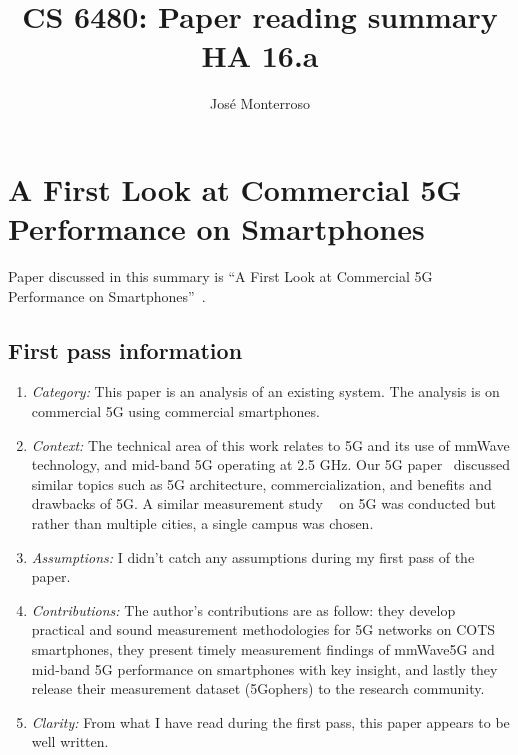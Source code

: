 \documentclass[letterpaper,twocolumn,10pt]{article}
\title{CS 6480: Paper reading summary\\
HA 16.a\\}
\author{José Monterroso}
\affil{School of Computing, University of Utah}
\begin{document}
\maketitle
\section{A First Look at Commercial 5G Performance on Smartphones}

Paper discussed in this summary is ``A First Look at Commercial 5G Performance on Smartphones''~\cite{commercial5g}.

\subsection{First pass information}
\label{sec:first}
\begin{enumerate}

\item {\it Category:} 
This paper is an analysis of an existing system. The analysis is on commercial 5G using commercial smartphones.

\item {\it Context:} 
The technical area of this work relates to 5G and its use of mmWave technology, and mid-band 5G operating at 
2.5 GHz. Our 5G paper~\cite{5gwhite} discussed similar topics such as 5G architecture, commercialization, and 
benefits and drawbacks of 5G. A similar measurement study ~\cite{measurementstudy} on 5G was conducted but 
rather than multiple cities, a single campus was chosen.

\item {\it Assumptions:}  
I didn't catch any assumptions during my first pass of the paper. 

\item {\it Contributions:} 
The author's contributions are as follow: they develop practical and sound measurement methodologies for 5G 
networks on COTS smartphones, they present timely measurement findings of mmWave5G and mid-band 5G 
performance on smartphones with key insight, and lastly they release their measurement dataset (5Gophers) 
to the research community. 

\item {\it Clarity:} From what I have read during the first pass, this paper appears to be well written. 

\end{enumerate}
\end{document}

